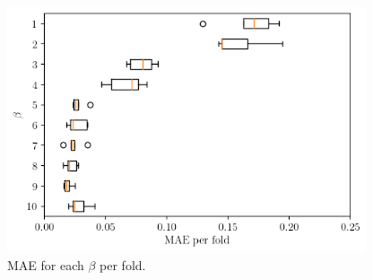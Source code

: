 \begin{figure}[H]
	\centering
	\includegraphics[width=300pt]{files/mae_folds.png}
	\caption{MAE for each $\beta$ per fold.}
	\label{fig:fold-mae}
\end{figure}

